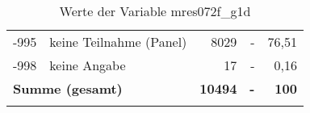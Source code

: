 \begin{longtable}{Xlrrr}
       -995 & keine Teilnahme (Panel) & 8029 & - & 76,51 \\

       -998 & keine Angabe & 17 & - & 0,16 \\

     \midrule
     \multicolumn{2}{l}{\textbf{Summe (gesamt)}} & \textbf{10494} & \textbf{-} & \textbf{100} \\
     \bottomrule
     \caption{Werte der Variable mres072f\_g1d}
     \end{longtable}
     
